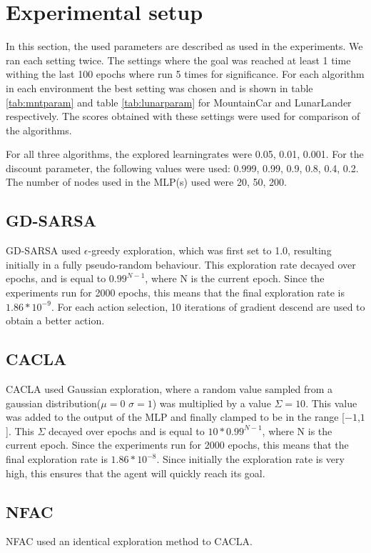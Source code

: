
\section{Experimental setup}


In this section, the used parameters are described as used in the experiments. We ran each setting twice. The settings where the goal was reached at least 1 time withing the last 100 epochs where run 5 times for significance. For each algorithm in each environment the best setting was chosen and is shown in table \ref{tab:mntparam} and table \ref{tab:lunarparam} for MountainCar and LunarLander respectively. The scores obtained with these settings were used for comparison of the algorithms. 

For all three algorithms, the explored learningrates were 0.05, 0.01, 0.001. For the discount parameter, the following values were used: 0.999, 0.99, 0.9, 0.8, 0.4, 0.2. The number of nodes used in the MLP(s) used were 20, 50, 200.

\subsection{GD-SARSA}
GD-SARSA used $\epsilon$-greedy exploration, which was first set to 1.0, resulting initially in a fully pseudo-random behaviour. This exploration rate decayed over epochs, and is equal to $0.99^{N-1}$, where N is the current epoch. Since the experiments run for 2000 epochs, this means that the final exploration rate is $1.86*10^{-9}$. For each action selection, 10 iterations of gradient descend are used to obtain a better action. 
\subsection{CACLA}
CACLA used Gaussian exploration, where a random value sampled from a gaussian distribution($\mu=0$ $\sigma=1$) was multiplied by a value $\Sigma=10$. This value was added to the output of the MLP and finally clamped to be in the range [$-1$,$1$]. This $\Sigma$ decayed over epochs and is equal to  $10 * 0.99^{N-1}$, where N is the current epoch. Since the experiments run for 2000 epochs, this means that the final exploration rate is $1.86*10^{-8}$. Since initially the exploration rate is very high, this ensures that the agent will quickly reach its goal. 
\subsection{NFAC}
NFAC used an identical exploration method to CACLA.

